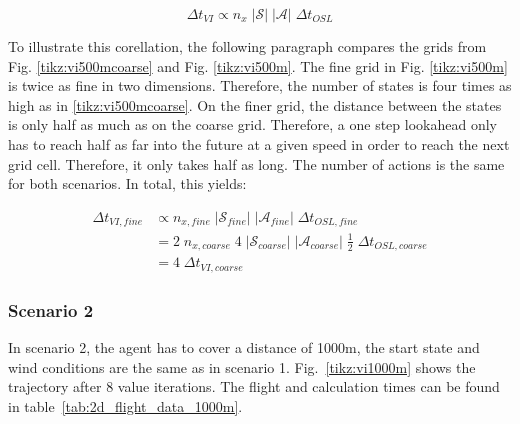 \begin{equation}
	\Delta t_{VI} \propto n_x \; |\mathcal{S}| \; |\mathcal{A}| \; \Delta t_{OSL}
	\label{eq:calc_time}
\end{equation}

To illustrate this corellation, the following paragraph compares the grids from Fig. \ref{tikz:vi500mcoarse} and Fig. \ref{tikz:vi500m}. The fine grid in Fig. \ref{tikz:vi500m} is twice as fine in two dimensions. Therefore, the number of states is four times as high as in \ref{tikz:vi500mcoarse}. On the finer grid, the distance between the states is only half as much as on the coarse grid. Therefore, a one step lookahead only has to reach half as far into the future at a given speed in order to reach the next grid cell. Therefore, it only takes half as long. The number of actions is the same for both scenarios. In total, this yields:

\begin{align}
\Delta t_{VI,fine} &\propto n_{x,fine} \; |\mathcal{S}_{fine}| \; |\mathcal{A}_{fine}| \; \Delta t_{OSL,fine} \\
&= 2 \; n_{x,coarse} \; 4 \; |\mathcal{S}_{coarse}| \; |\mathcal{A}_{coarse}| \; \frac{1}{2} \; \Delta t_{OSL,coarse} \\
&=4 \;\Delta t_{VI,coarse}
\end{align}

\subsubsection{Scenario 2}

In scenario 2, the agent has to cover a distance of 1000m, the start state and wind conditions are the same as in scenario 1. Fig.~\ref{tikz:vi1000m} shows the trajectory after 8 value iterations. The flight and calculation times can be found in table~\ref{tab:2d_flight_data_1000m}.

